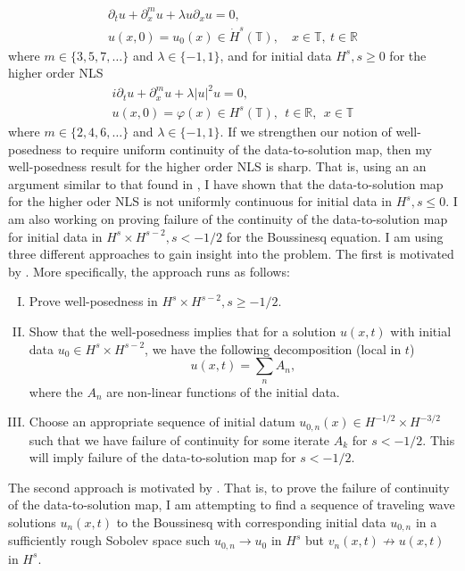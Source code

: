 \documentclass[12pt,reqno]{amsart}
\newcommand{\rr}{\mathbb{R}}
\newcommand{\ci}{\mathbb{T}}
\newcommand{\p}{\partial}
\newcommand{\vp}{\varphi}
\begin{document}
\begin{gather}
	\label{mmKDV-eq}
	\p_t u + \p_x^{m} u + \lambda u \p_x u = 0,
	\\
	\label{mmKDV-init-data}
  u(x,0) = u_0(x) \in \dot{H}^{s}(\ci), \quad x \in \ci, \ t \in \rr
\end{gather}
%
%
where $m \in \{3, 5, 7,\dots \}$ and $\lambda \in \{-1, 1\}$, 
%
and for initial data $H^{s}, s \ge 0$ for the higher order NLS
%
%
\begin{gather}
	\label{nmNLS-eq}
	i \p_t u + \p_x^{m} u + \lambda |u|^2 u =0,
		\\
		\label{nmNLS-init-data}
		u(x,0) = \vp(x) \in H^s(\ci), \ \ t \in \rr, \ \ x \in \ci
\end{gather}
%
%
where $m \in \{2,4,6,\dots\}$ and $\lambda \in \{-1, 1\}$. If we strengthen our
notion of well-posedness to require uniform continuity of the data-to-solution
map, then my well-posedness result for the higher order NLS is sharp. That is,
using an an argument
similar to that found in \cite{Burq_Gerad_Tzvetkov-An-instability-}, I have
shown that the data-to-solution map for the higher oder NLS is not uniformly
continuous for initial data in $H^{s}, s \le 0$. 
%
%
%
I am also working on proving failure of the continuity of the data-to-solution map for
initial data in $H^{s} \times H^{s-2}, s < -1/2$ for the Boussinesq equation. I am using three
different approaches to gain insight into the problem. The first is motivated by
\cite{Bejenaru-Tao-2006-Sharp-well-posedness-and-ill-posedness}. More
specifically, the approach runs as follows:
\begin{enumerate}[I.]
  \item
    Prove well-posedness in $H^{s} \times H^{s-2}, s \ge -1/2$.
 \item
   Show that the well-posedness implies that for a solution $u(x,t)$ with
   initial data $u_{0} \in H^{s} \times H^{s-2}$, we have the following
   decomposition (local in $t$) 
   $$u(x,t) = \sum_{n} A_{n},$$ where the $A_{n}$ are non-linear functions of
   the initial data. 
 \item 
   Choose an appropriate sequence of initial datum $u_{0,n}(x) \in H^{-1/2}
   \times H^{-3/2}$ such that
   we have failure of continuity for some iterate $A_{k}$ for $s < -1/2$.
   This will imply
   failure of the data-to-solution map for $s < -1/2$.
   \end{enumerate}
%
The second approach is motivated by \cite{Himonas:2005kx}. That is,
to prove the failure of continuity of the data-to-solution map, I am attempting
to find a sequence of traveling wave solutions $u_{n}(x,t)$ to the Boussinesq with
corresponding initial data $u_{0,n}$ in a sufficiently rough Sobolev space such 
$u_{0,n} \to u_{0}$ in $H^{s}$ but $v_{n}(x,t) \not \to u(x,t)$ in $H^{s}$. 
\end{document}
